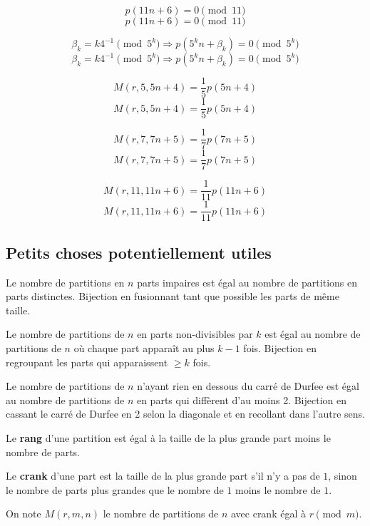 \documentclass[a4paper,11pt]{article}
\newcommand\eq[2]{
\ifthenelse{\isempty{#1}}
{\begin{equation*}#2\end{equation*}}
{\begin{equation*}#2\tag{#1}\end{equation*}}
}
\begin{document}
\eq{}{p(11n + 6) = 0 \pmod {11}}

\eq{}{\beta_k = k 4^{-1} \pmod {5^k} \Rightarrow p(5^k n + \beta_k) = 0 \pmod {5^k}}

\eq{}{M(r,5,5n+4) = \frac{1}{5} p(5n + 4)}

\eq{}{M(r,7,7n+5) = \frac{1}{7} p(7n + 5)}

\eq{}{M(r,11,11n+6) = \frac{1}{11} p(11n + 6)}

\subsection{Petits choses potentiellement utiles}

Le nombre de partitions en $n$ parts impaires est égal au nombre de partitions en parts distinctes. 
Bijection en fusionnant tant que possible les parts de même taille.


Le nombre de partitions de $n$ en parts non-divisibles par $k$ est égal au nombre de partitions de $n$ où chaque part apparaît au plus $k-1$ fois. 
Bijection en regroupant les parts qui apparaissent $\ge k$ fois.


Le nombre de partitions de $n$ n'ayant rien en dessous du carré de Durfee est égal au nombre de partitions de $n$ en parts qui diffèrent d'au moins 2.
Bijection en cassant le carré de Durfee en 2 selon la diagonale et en recollant dans l'autre sens.

Le \textbf{rang} d'une partition est égal à la taille de la plus grande part moins le nombre de parts.

Le \textbf{crank} d'une part est la taille de la plus grande part s'il n'y a pas de $1$, sinon le nombre de parts plus grandes
que le nombre de $1$ moins le nombre de $1$.

On note $M(r,m,n)$ le nombre de partitions de $n$ avec crank égal à $r \pmod m$.
\end{document}
